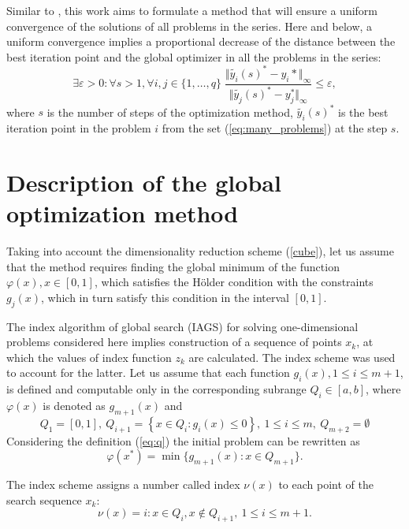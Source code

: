 \documentclass[runningheads]{llncs}
\begin{document}
Similar to \cite{BarkalovStrongin2018}, this work aims to formulate a method that will ensure a uniform convergence of the
solutions of all problems in the series. Here and below, a uniform convergence implies a proportional decrease
of the distance between the best iteration point and the
global optimizer in all the problems in the series:
\begin{equation}
  \exists \varepsilon > 0: \forall s>1, \forall i,j\in\{1,\dots,q\}\;
    \frac{\Vert \tilde{y_i}(s)^* - y_i*\Vert_\infty}{\Vert \tilde{y_j}(s)^* - y^*_j\Vert_	\infty} \leqslant \varepsilon,
\end{equation}
where \(s\) is the number of steps of the optimization method, \(\tilde{y_i}(s)^*\) is the best iteration point
in the problem \(i\) from the set (\ref{eq:many_problems}) at the step \(s\).

\section{Description of the global optimization method}
\label{sec:method}

Taking into account the dimensionality reduction scheme (\ref{cube}), let us assume that the method
requires finding the global minimum of the function \(\varphi(x),
x\in[0,1]\), which satisfies the H\"{o}lder condition with the constraints \(g_j(x)\), which in turn satisfy
this condition in the interval \([0,1]\).

The index algorithm of global search (IAGS) for solving one-dimensional problems
considered here implies construction of a sequence of points
\(x_k\), at which the values of index function \(z_k\) are calculated.
The index scheme \cite{Strongin2000} was used to account for the latter.
Let us assume that each function \(g_i(x), 1 \leqslant i \leqslant m + 1\), is defined and computable
only in the corresponding subrange \(Q_i \in [a, b]\), where \(\varphi(x)\) is denoted as \(g_{m+1}(x)\) and
\begin{equation}
  \label{eq:q}
  Q_1=[0,1],\: Q_{i+1}=\left\{x\in Q_i:g_{i}(x)\leqslant 0\right\},\:1 \leqslant i \leqslant m, \: Q_{m+2}=\emptyset
\end{equation}
Considering the definition (\ref{eq:q}) the initial problem can be rewritten as
\begin{displaymath}
  \varphi(x^*)=\min\{g_{m+1}(x):x\in Q_{m+1}\}.
\end{displaymath}

The index scheme assigns a number called index \(\nu(x)\) to each point of the search sequence \(x_k\):
\begin{equation}
  \nu(x) = i:x\in Q_i, x\not\in Q_{i+1},\:1\leqslant i\leqslant m + 1.
\end{equation}
\end{document}
